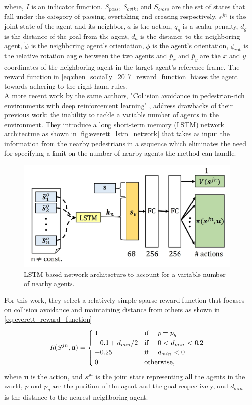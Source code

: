 where, $I$ is an indicator function. $S_{pass}$, $S_{ovtk}$, and $S_{cross}$ are the set of states that fall under the category of passing, overtaking and crossing respectively, $s^{jn}$ is the joint state of the agent and its neighbor, $a$ is the action, $q_{n}$ is a scalar penalty, $d_{g}$ is the distance of the goal from the agent, $d_{a}$ is the distance to the neighboring agent, $\tilde{\phi}$ is the neighboring agent's orientation, $\phi$ is the agent's orientation, $\tilde{\phi_{rot}}$ is the relative rotation angle between the two agents and $\tilde{p_x}$ and $\tilde{p_y}$ are the $x$ and $y$ coordinates of the neighboring agent in the target agent's reference frame. The reward function in \autoref{eq:chen_socially_2017_reward_function} biases the agent towards adhering to the right-hand rules.
\\

A more recent work by the same authors, "Collision avoidance in pedestrian-rich environments with deep reinforcement learning" \cite{everett_collision_2019}, %
address drawbacks of their previous work: the inability to tackle a variable number of agents in the environment. They introduce a long short-term memory (LSTM) \cite{hochreiterLongShortTermMemory1997} network architecture as shown in \autoref{fig:everett_lstm_network} that takes as input the information from the nearby pedestrians in a sequence which eliminates the need for specifying a limit on the number of nearby-agents the method can handle.
\begin{figure}[!htbp]
	\centering
	\includegraphics[width=0.6\linewidth]{figures/everett}
	\caption{LSTM based network architecture to account for a variable number of nearby agents.}
	\label{fig:everett_lstm_network}
\end{figure}
 For this work, they select a relatively simple sparse reward function that focuses on collision avoidance and maintaining distance from others as shown in \autoref{eq:everett_reward_function}\\
\begin{align}
\label{eq:everett_reward_function}
R(S^{jn}, \mathbf{u}) = 
\begin{cases}
	 1 & \text{if \quad $p=p_g$} \\
	 -0.1+d_{min}/2 & \text{if \quad 0 < $d_{min}$ < 0.2} \\
	 -0.25 & \text{if \quad $d_{min}$ < 0}\\
	 0 & \text{otherwise}, 
\end{cases}
\end{align}
where $\mathbf{u}$ is the action, and $s^{jn}$ is the joint state representing all the agents in the world, $p$ and $p_{g}$ are the position of the agent and the goal respectively, and $d_{min}$ is the distance to the nearest neighboring agent.
